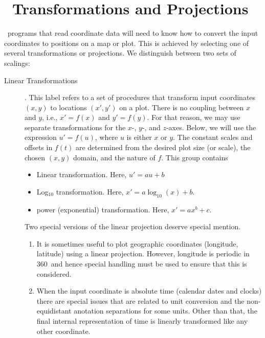 %
%
\chapter{\gmt\ Transformations and Projections}
\thispagestyle{headings}

\GMT\ programs that read coordinate data will need to know how
to convert the input coordinates to positions on a map or plot.
This is achieved by selecting one of several transformations or projections.
We distinguish between two sets of scalings:
\begin{description}
\item [Linear Transformations].  This label refers to a set of procedures
that transform input coordinates $(x,y)$ to locations $(x', y')$ on a plot.
There is no coupling between $x$ and $y$, i.e., $x' = f(x)$ and $y' = f(y)$.
For that reason, we may use separate transformations for the $x$-, $y$-, and
$z$-axes.
Below, we will use the expression $u' = f(u)$, where $u$ is either $x$ or $y$.
The constant scales and offsets in $f(t)$ are determined from the desired plot
size (or scale), the chosen $(x,y)$ domain, and the nature of $f$.
This group contains
\begin{itemize}
\item Linear transformation.  Here, $u' = au + b$
\item Log$_{10}$ transformation.  Here, $x' = a \log_{10}(x) + b$.
\item power (exponential) transformation.  Here, $x' = a x^b + c$.
\end{itemize}
Two special versions of the linear projection deserve special mention.
\begin{enumerate}
\item It is sometimes useful to plot geographic coordinates (longitude, latitude) using
a linear projection.  However, longitude is periodic in 360\DS\ and hence special handling
must be used to ensure that this is considered.
\item When the input coordinate is absolute time (calendar dates and clocks) there are special
issues that are related to unit conversion and the non-equidistant anotation separations for
some units.  Other than that, the final internal representation of time is linearly transformed
like any other coordinate.
\end{enumerate}

\end{description}
